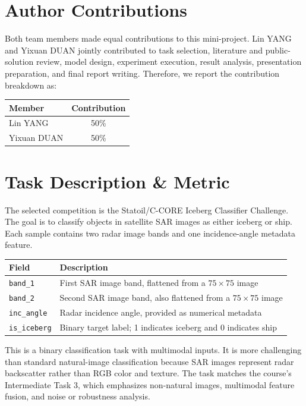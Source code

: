 \documentclass[11pt]{article}
\begin{document}
\section*{Author Contributions}

Both team members made equal contributions to this mini-project. Lin YANG and Yixuan DUAN jointly contributed to task selection, literature and public-solution review, model design, experiment execution, result analysis, presentation preparation, and final report writing. Therefore, we report the contribution breakdown as:

\begin{center}
\begin{tabular}{lc}
\toprule
Member & Contribution \\
\midrule
Lin YANG & 50\% \\
Yixuan DUAN & 50\% \\
\bottomrule
\end{tabular}
\end{center}

\section{Task Description \& Metric}

The selected competition is the Statoil/C-CORE Iceberg Classifier Challenge. The goal is to classify objects in satellite SAR images as either iceberg or ship. Each sample contains two radar image bands and one incidence-angle metadata feature.

\begin{center}
\begin{tabular}{ll}
\toprule
Field & Description \\
\midrule
\texttt{band\_1} & First SAR image band, flattened from a $75 \times 75$ image \\
\texttt{band\_2} & Second SAR image band, also flattened from a $75 \times 75$ image \\
\texttt{inc\_angle} & Radar incidence angle, provided as numerical metadata \\
\texttt{is\_iceberg} & Binary target label; 1 indicates iceberg and 0 indicates ship \\
\bottomrule
\end{tabular}
\end{center}

This is a binary classification task with multimodal inputs. It is more challenging than standard natural-image classification because SAR images represent radar backscatter rather than RGB color and texture. The task matches the course's Intermediate Task 3, which emphasizes non-natural images, multimodal feature fusion, and noise or robustness analysis.
\end{document}
